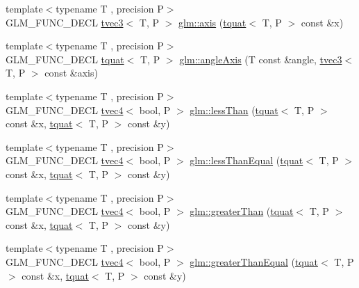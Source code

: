 \begin{DoxyCompactItemize}
{\footnotesize template$<$typename T , precision P$>$ }\\G\+L\+M\+\_\+\+F\+U\+N\+C\+\_\+\+D\+E\+CL \hyperlink{structglm_1_1tvec3}{tvec3}$<$ T, P $>$ \hyperlink{group__gtc__quaternion_ga0b3e87a13b2708154b72259e50789a19}{glm\+::axis} (\hyperlink{structglm_1_1tquat}{tquat}$<$ T, P $>$ const \&x)
\item 
{\footnotesize template$<$typename T , precision P$>$ }\\G\+L\+M\+\_\+\+F\+U\+N\+C\+\_\+\+D\+E\+CL \hyperlink{structglm_1_1tquat}{tquat}$<$ T, P $>$ \hyperlink{group__gtc__quaternion_ga37ae19405f1ccf766f27e4fcd035d859}{glm\+::angle\+Axis} (T const \&angle, \hyperlink{structglm_1_1tvec3}{tvec3}$<$ T, P $>$ const \&axis)
\item 
{\footnotesize template$<$typename T , precision P$>$ }\\G\+L\+M\+\_\+\+F\+U\+N\+C\+\_\+\+D\+E\+CL \hyperlink{structglm_1_1tvec4}{tvec4}$<$ bool, P $>$ \hyperlink{group__gtc__quaternion_ga91a40d16a3b5bb47d71ac1a3fb688ffa}{glm\+::less\+Than} (\hyperlink{structglm_1_1tquat}{tquat}$<$ T, P $>$ const \&x, \hyperlink{structglm_1_1tquat}{tquat}$<$ T, P $>$ const \&y)
\item 
{\footnotesize template$<$typename T , precision P$>$ }\\G\+L\+M\+\_\+\+F\+U\+N\+C\+\_\+\+D\+E\+CL \hyperlink{structglm_1_1tvec4}{tvec4}$<$ bool, P $>$ \hyperlink{group__gtc__quaternion_ga7c81996ed2724f26fe76faf352c76294}{glm\+::less\+Than\+Equal} (\hyperlink{structglm_1_1tquat}{tquat}$<$ T, P $>$ const \&x, \hyperlink{structglm_1_1tquat}{tquat}$<$ T, P $>$ const \&y)
\item 
{\footnotesize template$<$typename T , precision P$>$ }\\G\+L\+M\+\_\+\+F\+U\+N\+C\+\_\+\+D\+E\+CL \hyperlink{structglm_1_1tvec4}{tvec4}$<$ bool, P $>$ \hyperlink{group__gtc__quaternion_ga09d21a588ae425ac7517ea65cc59a5ae}{glm\+::greater\+Than} (\hyperlink{structglm_1_1tquat}{tquat}$<$ T, P $>$ const \&x, \hyperlink{structglm_1_1tquat}{tquat}$<$ T, P $>$ const \&y)
\item 
{\footnotesize template$<$typename T , precision P$>$ }\\G\+L\+M\+\_\+\+F\+U\+N\+C\+\_\+\+D\+E\+CL \hyperlink{structglm_1_1tvec4}{tvec4}$<$ bool, P $>$ \hyperlink{group__gtc__quaternion_ga0906a221a2037519fcf316ea5c1e3b3e}{glm\+::greater\+Than\+Equal} (\hyperlink{structglm_1_1tquat}{tquat}$<$ T, P $>$ const \&x, \hyperlink{structglm_1_1tquat}{tquat}$<$ T, P $>$ const \&y)
\item 

\end{DoxyCompactItemize}
